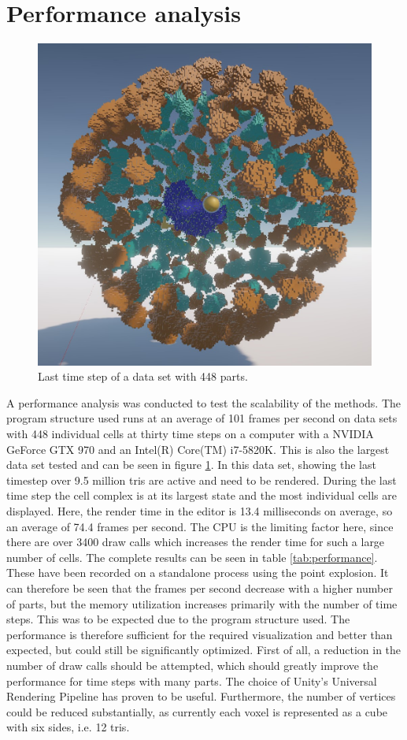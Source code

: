 \section{Performance analysis}
\begin{figure}[t]
	\centering
	\includegraphics[width=0.7\linewidth]{fig/Images/largeDataset}
	\caption[]{Last time step of a data set with 448 parts.}
	\label{fig:largeDataset}
\end{figure}
A performance analysis was conducted to test the scalability of the methods. The program structure used runs at an average of 101 frames per second on data sets with 448 individual cells at thirty time steps on a computer with a NVIDIA GeForce GTX 970 and an Intel(R) Core(TM) i7-5820K. This is also the largest data set tested and can be seen in figure \ref{fig:largeDataset}. In this data set, showing the last timestep over 9.5 million tris are active and need to be rendered. During the last time step the cell complex is at its largest state and the most individual cells are displayed. Here, the render time in the editor is 13.4 milliseconds on average, so an average of 74.4 frames per second. The CPU is the limiting factor here, since there are over 3400 draw calls which increases the render time for such a large number of cells.
The complete results can be seen in table \ref{tab:performance}. These have been recorded on a standalone process using the point explosion. 
It can therefore be seen that the frames per second decrease with a higher number of parts, but the memory utilization increases primarily with the number of time steps. This was to be expected due to the program structure used. 
The performance is therefore sufficient for the required visualization and better than expected, but could still be significantly optimized. First of all, a reduction in the number of draw calls should be attempted, which should greatly improve the performance for time steps with many parts. The choice of Unity's Universal Rendering Pipeline has proven to be useful. Furthermore, the number of vertices could be reduced substantially, as currently each voxel is represented as a cube with six sides, i.e. 12 tris.
